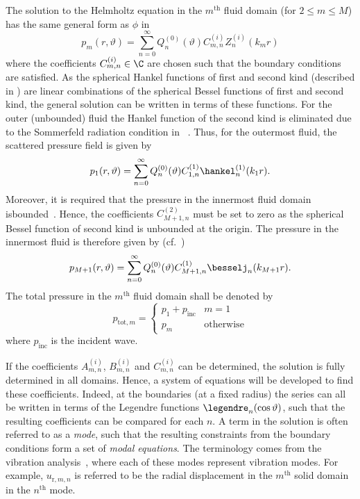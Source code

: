 The solution to the Helmholtz equation in the $m^{\mathrm{th}}$ fluid domain (for $2 \leq m \leq M$) has the same general form as $\phi$ in 
\begin{equation}\label{Eq1:generalSol}
	p_m(r,\vartheta) = \sum_{n=0}^\infty Q_n^{(0)}(\vartheta)C_{m,n}^{(i)} Z_n^{(i)}(k_m r)
\end{equation}
where the coefficients $C_{m,n}^{(i)}\in\C$ are chosen such that the boundary conditions are satisfied. As the spherical Hankel functions of first and second kind (described in  ) are linear combinations of the spherical Bessel functions of first and second kind, the general solution can be written in terms of these functions. For the outer (unbounded) fluid the Hankel function of the second kind is eliminated due to the Sommerfeld radiation condition in ~\cite[p. 26]{Ihlenburg1998fea}. Thus, for the outermost fluid, the scattered pressure field is given by
\begin{equation}\label{Eq1:outerFluid}
	p_1(r,\vartheta) = \sum_{n=0}^\infty Q_n^{(0)}(\vartheta) C_{1,n}^{(1)} \hankel^{(1)}_n(k_1 r).
\end{equation}
Moreover, it is required that the pressure in the innermost fluid domain is\linebreak bounded~\cite[p. 10]{Fender1972sfa}. Hence, the coefficients $C_{M+1,n}^{(2)}$ must be set to zero as the spherical Bessel function of second kind is unbounded at the origin. The pressure in the innermost fluid is therefore given by (cf.~\cite[p. 10]{Fender1972sfa})
\begin{equation}\label{Eq1:innerFluid}
	p_{M+1}(r,\vartheta) = \sum_{n=0}^\infty Q_n^{(0)}(\vartheta) C_{M+1,n}^{(1)} \besselj_n(k_{M+1} r).
\end{equation}
The total pressure in the $m^{\mathrm{th}}$ fluid domain shall be denoted by
\begin{equation}\label{Eq1:totPressure}
	p_{\mathrm{tot},m} =\begin{cases}
	p_1 + p_{\mathrm{inc}}& m = 1\\
	p_m & \text{otherwise}
	\end{cases}	
\end{equation}
where $p_{\mathrm{inc}}$ is the incident wave.

If the coefficients $A_{m,n}^{(i)}$, $B_{m,n}^{(i)}$ and $C_{m,n}^{(i)}$ can be determined, the solution is fully determined in all domains. Hence, a system of equations will be developed to find these coefficients. Indeed, at the boundaries (at a fixed radius) the series can all be written in terms of the Legendre functions $\legendre_n(\cos\vartheta)$, such that the resulting coefficients can be compared for each $n$. A term in the solution is often referred to as a \textit{mode}, such that the resulting constraints from the boundary conditions form a set of \textit{modal equations}. The terminology comes from the vibration analysis~\cite{Chang1994voa}, where each of these modes represent vibration modes. For example, $u_{\mathrm{r},m,n}$ is referred to be the radial displacement in the $m^{\mathrm{th}}$ solid domain in the $n^{\mathrm{th}}$ mode.

